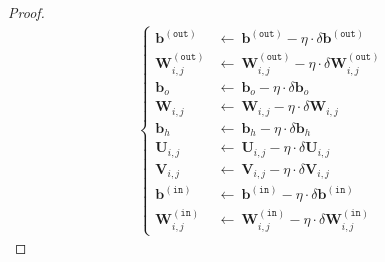 \documentclass{article}
\renewcommand{\bf}[1]{\mathbf{#1}}
\renewcommand{\tt}[1]{\mathtt{#1}}
\begin{document}
\begin{proof}
    \vspace{-2.2em}
    \begin{align*}
        \ \left\{
        \begin{array}{rl}
            \bf{b}^{\tt{(out)}} &\gets\ \bf{b}^{\tt{(out)}}-\eta\cdot\delta\bf{b}^{\tt{(out)}} \\
            \bf{W}_{i,j}^{\tt{(out)}} &\gets\ \bf{W}_{i,j}^{\tt{(out)}} - \eta\cdot\delta\bf{W}_{i,j}^{\tt{(out)}} \\
            \bf{b}_o &\gets\ \bf{b}_o - \eta\cdot\delta\bf{b}_o \\
            \bf{W}_{i,j} &\gets\ \bf{W}_{i,j} - \eta\cdot\delta\bf{W}_{i,j} \\
            \bf{b}_h &\gets\ \bf{b}_h - \eta\cdot\delta\bf{b}_h \\
            \bf{U}_{i,j} &\gets\ \bf{U}_{i,j} - \eta\cdot\delta\bf{U}_{i,j} \\
            \bf{V}_{i,j} &\gets\ \bf{V}_{i,j} - \eta\cdot\delta\bf{V}_{i,j} \\ 
            \bf{b}^{\tt{(in)}} &\gets\ \bf{b}^{\tt{(in)}} - \eta\cdot\delta\bf{b}^{\tt{(in)}} \\
            \bf{W}_{i,j}^{\tt{(in)}} &\gets\ \bf{W}_{i,j}^{\tt{(in)}} - \eta\cdot\delta \bf{W}_{i,j}^{\tt{(in)}} 
        \end{array}
        \right.
    \end{align*}
\end{proof}
\end{document}
